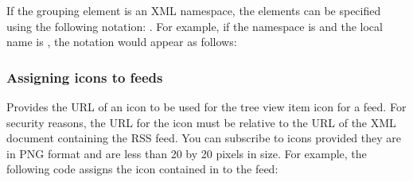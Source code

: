 \documentclass[letterpaper,12pt,english,openany,oneside]{sphinxmanual}
\begin{document}
\begin{sphinxVerbatim}[commandchars=\\\{\}]
\end{sphinxVerbatim}

If the grouping element is an XML namespace, the elements can be specified using the following notation: . For example, if the namespace is  and the local name is , the notation would appear as follows:

\begin{sphinxVerbatim}[commandchars=\\\{\}]
\end{sphinxVerbatim}




\subsubsection{Assigning icons to feeds}
\label{\detokenize{Tracker_InboxAPI:assigning-icons-to-feeds}}
\begin{sphinxVerbatim}[commandchars=\\\{\}]
\end{sphinxVerbatim}

Provides the URL of an icon to be used for the tree view item icon for a feed. For security reasons, the URL for the icon must be relative to the URL of the XML document containing the RSS feed. You can subscribe to icons provided they are in PNG format and are less than 20 by 20 pixels in size. For example, the following code assigns the icon contained in  to the feed:

\begin{sphinxVerbatim}[commandchars=\\\{\}]
\end{sphinxVerbatim}
\end{document}
